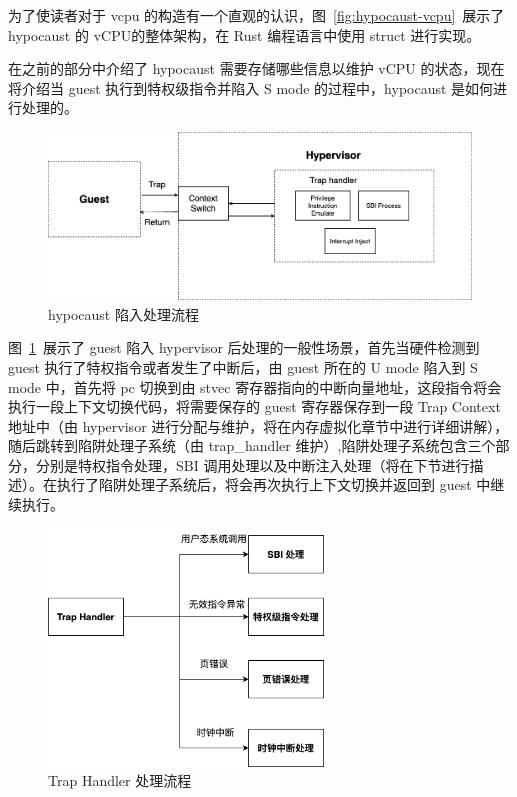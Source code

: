 为了使读者对于 vcpu 的构造有一个直观的认识，图~\ref{fig:hypocaust-vcpu}~展示了 hypocaust 的 vCPU的整体架构，在 Rust 编程语言中使用 struct 进行实现。


在之前的部分中介绍了 hypocaust 需要存储哪些信息以维护 vCPU 的状态，现在将介绍当 guest 执行到特权级指令并陷入 S mode 的过程中，hypocaust 是如何进行处理的。

\begin{figure}[]
    \centering
    \includegraphics[width=1\textwidth]{thesis-images/hypocaust-trap.png}
    \caption{hypocaust 陷入处理流程}\label{fig:hypocaust-trap}
\end{figure}

图~\ref{fig:hypocaust-trap}~展示了 guest 陷入 hypervisor 后处理的一般性场景，首先当硬件检测到 guest 执行了特权指令或者发生了中断后，由 guest 所在的 U mode 陷入到 S mode 中，首先将 pc 切换到由 stvec 寄存器指向的中断向量地址，这段指令将会执行一段上下文切换代码，将需要保存的 guest 寄存器保存到一段 Trap Context 地址中（由 hypervisor 进行分配与维护，将在内存虚拟化章节中进行详细讲解），随后跳转到陷阱处理子系统（由 trap\_handler 维护）,陷阱处理子系统包含三个部分，分别是特权指令处理，SBI 调用处理以及中断注入处理（将在下节进行描述）。在执行了陷阱处理子系统后，将会再次执行上下文切换并返回到 guest 中继续执行。

\begin{figure}[]
    \centering
    \includegraphics[width=0.65\textwidth]{thesis-images/trap-handler.png}
    \caption{Trap Handler 处理流程}\label{fig:trap-handler}
\end{figure}


